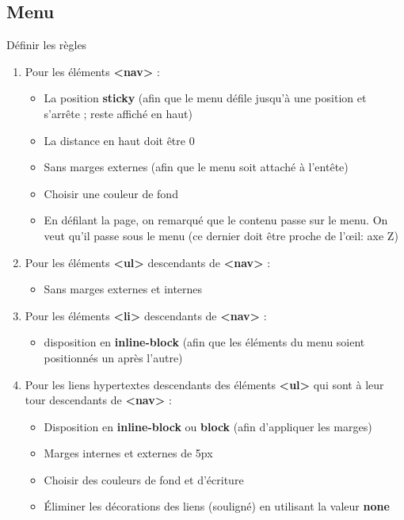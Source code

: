 \documentclass[11pt, a4paper]{article}
\begin{document}
\subsection*{Menu}

Définir les règles 
\begin{enumerate}
	\item Pour les éléments \textbf{<nav>} :
	\begin{multicols}{2}
	\begin{itemize}
		\item La position \textbf{sticky} (afin que le menu défile jusqu'à une position et s'arrête ; reste affiché en haut)
		\item La distance en haut doit être 0 
		\item Sans marges externes (afin que le menu soit attaché à l'entête)
		\item Choisir une couleur de fond 
		\item En défilant la page, on remarqué que le contenu passe sur le menu. 
		On veut qu'il passe sous le menu (ce dernier doit être proche de l'œil: axe Z)
	\end{itemize} 
	\end{multicols}
	\item Pour les éléments \textbf{<ul>} descendants de \textbf{<nav>} :
	\begin{itemize}
		\item Sans marges externes et internes
	\end{itemize} 
	\item Pour les éléments \textbf{<li>} descendants de \textbf{<nav>} :
	\begin{itemize}
		\item disposition en \textbf{inline-block} (afin que les éléments du menu soient positionnés un après l'autre)
	\end{itemize} 
	\item Pour les liens hypertextes descendants des éléments \textbf{<ul>} qui sont à leur tour descendants de \textbf{<nav>}  :
	\begin{multicols}{2}
	\begin{itemize}
		\item Disposition en \textbf{inline-block} ou \textbf{block} (afin d'appliquer les marges)
		\item Marges internes et externes de 5px
		\item Choisir des couleurs de fond et d'écriture
		\item Éliminer les décorations des liens (souligné) en utilisant la valeur \textbf{none}

\end{itemize}
\end{multicols}
\end{enumerate}
\end{document}
